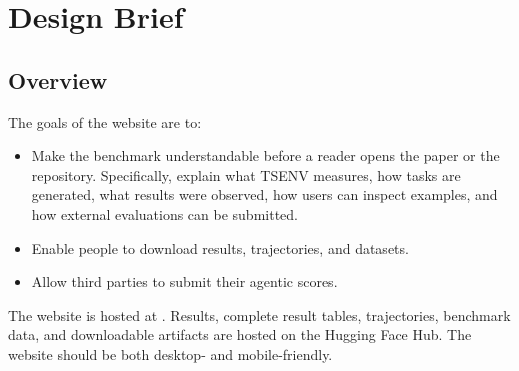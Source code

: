 \documentclass[11pt]{article}
\begin{document}
\label{sec:website-design-brief}
\section*{Design Brief}
\label{sec:website-overview}
\subsection*{Overview}
The goals of the website are to:
\begin{itemize}
    \item Make the benchmark understandable before a reader opens the paper or the repository.
    Specifically, explain what TSENV measures, how tasks are generated, what results were observed, how users can inspect examples, and how external evaluations can be submitted.
    \item Enable people to download results, trajectories, and datasets.
    \item Allow third parties to submit their agentic scores.
\end{itemize}
The website is hosted at .
Results, complete result tables, trajectories, benchmark data, and downloadable artifacts are hosted on the Hugging Face Hub.
The website should be both desktop- and mobile-friendly.



\label{sec:website-user-admin-actions}
\end{document}
